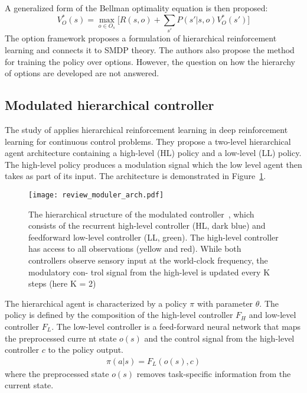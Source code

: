 A generalized form of the Bellman optimality equation is then proposed:
\begin{equation}
    V_O^*(s) = \max_{o \in O_s} \big[ R(s,o)+\sum_{s'}P(s' \lvert s,o) V_O^*(s') \big]
\end{equation}
The option framework proposes a formulation of hierarchical reinforcement learning and connects it to SMDP theory. The authors also propose the method for training the policy over options. However, the question on how the hierarchy of options are developed are not answered.

\subsection{Modulated hierarchical controller}
The study of \cite{heess2016learning} applies hierarchical reinforcement learning in deep reinforcement learning for continuous control problems. They propose a two-level hierarchical agent architecture containing a high-level (HL) policy and a low-level (LL) policy. The high-level policy produces a modulation signal which the low level agent then takes as part of its input. The architecture is demonstrated in Figure~\ref{review_moduler_arch}.
\begin{figure}[h]
	\texttt{[image: review\_moduler\_arch.pdf]}
	\centering
	\caption{The hierarchical structure of the modulated controller~\cite{heess2016learning}, which consists
		of the recurrent high-level controller (HL, dark blue) and
		feedforward low-level controller (LL, green).  The
		high-level controller has access to all observations (yellow and red). While both controllers observe sensory
		input at the world-clock frequency, the modulatory con-
		trol signal from the high-level is updated every K
		steps (here K = 2)}\label{review_moduler_arch}
\end{figure}
The hierarchical agent is characterized by a policy $\pi$ with parameter $\theta$. The policy is defined by the composition of the high-level controller $F_H$ and low-level controller $F_L$. The low-level controller is a feed-forward neural network that maps the preprocessed curre
nt state $o(s)$ and the control signal from the high-level controller $c$ to the policy output.
\begin{align}
\pi (a| s) = F_L(o(s),c)
\end{align}
where the preprocessed state $o(s)$ removes task-specific information from the current state.
